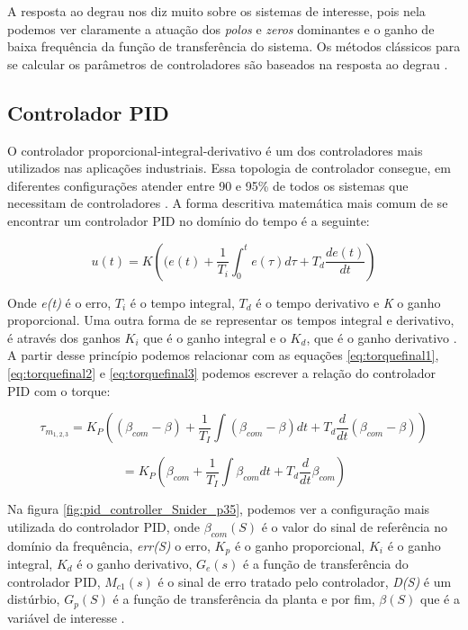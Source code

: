 A resposta ao degrau nos diz muito sobre os sistemas de interesse, pois nela podemos ver claramente a atuação dos \textit{polos} e \textit{zeros} dominantes e o ganho de baixa frequência da função de transferência do sistema. Os métodos clássicos para se calcular os parâmetros de controladores são baseados na resposta ao degrau \cite{Ogata}. 



\subsection{Controlador PID}

O controlador proporcional-integral-derivativo é um dos controladores mais utilizados nas aplicações industriais. Essa topologia de controlador consegue, em diferentes configurações atender entre 90 e 95\% de todos os sistemas que necessitam de controladores \cite{Levine1996}. A forma descritiva matemática mais comum de se encontrar um controlador PID no domínio do tempo é a seguinte:

\begin{equation}
  u(t) = K\left((e(t)+\frac{1}{T_i}\int_{0}^{t}{e(\tau)}d\tau+T_d\frac{de(t)}{dt}\right) 
\end{equation}

Onde \textit{e(t)} é o erro, \textit{$T_i$} é o tempo integral, \textit{$T_d$} é o tempo derivativo e \textit{K} o ganho proporcional. Uma outra forma de se representar os tempos integral e derivativo, é através dos ganhos \textit{$K_i$} que é o ganho integral e o \textit{$K_d$}, que é o ganho derivativo \cite{Astrom1995}. A partir desse princípio podemos relacionar com as equações \ref{eq:torquefinal1}, \ref{eq:torquefinal2} e \ref{eq:torquefinal3} podemos escrever a relação do controlador PID com o torque:

\begin{equation}
\tau_{m_{1,2,3}}=K_{P}\left((\beta_{com}-\beta)+\frac{1}{T_{I}}\int{(\beta_{com}-\beta)dt}+T_{d}\frac{d}{dt}(\beta_{com}-\beta)\right)
\end{equation}

\begin{equation}
=K_{P}\left(\beta_{com}+\frac{1}{T_{I}}\int{\beta_{com}dt}+T_{d}\frac{d}{dt}\beta_{com}\right) 
\end{equation}

Na figura \ref{fig:pid_controller_Snider_p35}, podemos ver a configuração mais utilizada do controlador PID, onde $\beta_{com}(S)$ é o valor do sinal de referência no domínio da frequência, \textit{err(S)} o erro, \textit{$K_p$} é o ganho proporcional, \textit{$K_i$} é o ganho integral, \textit{$K_d$} é o ganho derivativo, \textit{$G_e(s)$} é a função de transferência do controlador PID, \textit{$M_{c1}(s)$} é o sinal de erro tratado pelo controlador, \textit{D(S)} é um distúrbio, \textit{$G_p(S)$} é a função de transferência da planta e por fim, \textit{$\beta(S)$} que é a variável de interesse \cite{Snider}.

